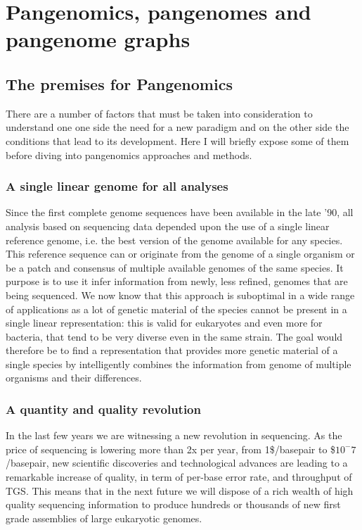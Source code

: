 \section{Pangenomics, pangenomes and pangenome graphs}
\subsection{The premises for Pangenomics}
There are a number of factors that must be taken into consideration to understand one one side the need for a new paradigm and on the other side the conditions that lead to its development. Here I will briefly expose some of them before diving into pangenomics approaches and methods. 
\subsubsection{A single linear genome for all analyses}
Since the first complete genome sequences have been available in the late '90, all analysis based on sequencing data depended upon the use of a single linear reference genome, i.e. the best version of the genome available for any species. This reference sequence can or originate from the genome of a single organism or be a patch and consensus of multiple available genomes of the same species. It purpose is to use it infer information from newly, less refined, genomes that are being sequenced. We now know that this approach is suboptimal in a wide range of applications as a lot of genetic material of the species cannot be present in a single linear representation: this is valid for eukaryotes and even more for bacteria, that tend to be very diverse even in the same strain. The goal would therefore be to find a representation that provides more genetic material of a single species by intelligently combines the information from genome of multiple organisms and their differences.

\subsubsection{A quantity and quality revolution }
In the last few years we are witnessing a new revolution in sequencing. As the price of sequencing is lowering more than 2x per year, from 1\$/basepair to \$$10^-7$/basepair\cite{durbin_recomb}, new scientific discoveries and technological advances are leading to a remarkable increase of quality, in term of per-base error rate, and throughput of TGS. This means that in the next future we will dispose of a rich wealth of high quality sequencing information to produce hundreds or thousands of new first grade assemblies of large eukaryotic genomes. 

